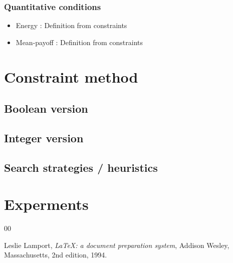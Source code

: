 \documentclass[preprint,12pt,authoryear]{elsarticle}
\begin{document}
\subsubsection{Quantitative conditions}
\begin{itemize}
  \item Energy : Definition from constraints
  \item Mean-payoff : Definition from constraints
\end{itemize}


\section{Constraint method}
\subsection{Boolean version}
\subsection{Integer version}
\subsection{Search strategies / heuristics}

\section{Experments}





\begin{thebibliography}{00}


  Leslie Lamport,
  \textit{\LaTeX: a document preparation system},
  Addison Wesley, Massachusetts,
  2nd edition,
  1994.

\end{thebibliography}
\end{document}
